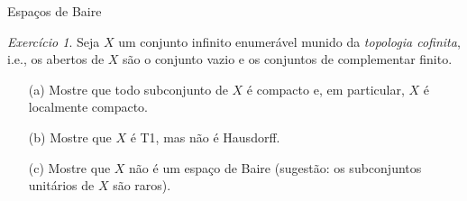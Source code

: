 \documentclass[oneside,11pt]{amsart}
\theoremstyle{remark}\newtheorem{exercise}{Exercício}[section]
\theoremstyle{plain}\newtheorem{teo}{Teorema}[section]
\theoremstyle{plain}\newtheorem{lem}[teo]{Lema}
\theoremstyle{plain}\newtheorem{prop}[teo]{Proposição}
\theoremstyle{definition}\newtheorem{defin}[teo]{Definição}
\theoremstyle{remark}\newtheorem{rem}[teo]{Observação}
\theoremstyle{definition}\newtheorem{example}[teo]{Exemplo}
\numberwithin{equation}{section}
\begin{document}
\begin{section}{Espaços de Baire}
\begin{exercise}
Seja $X$ um conjunto infinito enumerável munido da {\em topologia cofinita}, i.e., os abertos de $X$ são o conjunto vazio e os conjuntos de complementar finito.
\begin{itemize}
\item[(a)] Mostre que todo subconjunto de $X$ é compacto e, em particular, $X$ é localmente compacto.
\item[(b)] Mostre que $X$ é T1, mas não é Hausdorff.
\item[(c)] Mostre que $X$ não é um espaço de Baire (sugestão: os subconjuntos unitários de $X$ são raros).
\end{itemize}
\end{exercise}

\end{section}
\end{document}
